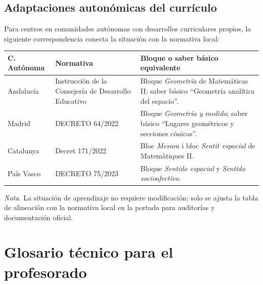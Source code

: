 \documentclass[12pt,a4paper]{scrartcl}
\begin{document}
\subsection{Adaptaciones autonómicas del currículo}\label{ap:adapt-auton}

Para centros en comunidades autónomas con desarrollos curriculares propios, la siguiente correspondencia conecta la situación con la normativa local:

\begin{center}
\small
\begin{tabularx}{\textwidth}{@{}p{}p{}X@{}}
\toprule
\textbf{C. Autónoma} & \textbf{Normativa} & \textbf{Bloque o saber básico equivalente} \\
\midrule
Andalucía & Instrucción de la Consejería de Desarrollo Educativo & Bloque \emph{Geometría} de Matemáticas II; saber básico ``Geometría analítica del espacio''. \\
\addlinespace[3pt]
Madrid & DECRETO 64/2022 & Bloque \emph{Geometría y medida}; saber básico ``Lugares geométricos y secciones cónicas''. \\
\addlinespace[3pt]
Catalunya & Decret 171/2022 & Bloc \emph{Mesura} i bloc \emph{Sentit espacial} de Matemàtiques II. \\
\addlinespace[3pt]
País Vasco & DECRETO 75/2023 & Bloque \emph{Sentido espacial} y \emph{Sentido socioafectivo}. \\
\bottomrule
\end{tabularx}
\end{center}

\textit{Nota.} La situación de aprendizaje no requiere modificación; solo se ajusta la tabla de alineación con la normativa local en la portada para auditorías y documentación oficial.

\newpage
\section{Glosario técnico para el profesorado}\label{ap:glos}
\end{document}
